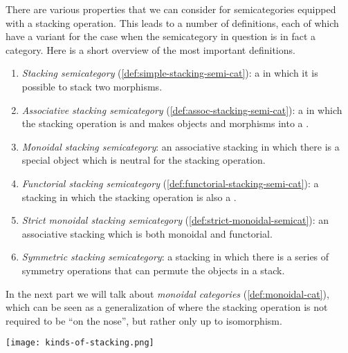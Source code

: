There are various properties that we can consider for semicategories equipped with a stacking operation.
This leads to a number of definitions, each of which have a variant for the case when the semicategory in question is in fact a category.
Here is a short overview of the most important definitions.
%
\begin{enumerate}
    \item \emph{Stacking semicategory} (\cref{def:simple-stacking-semi-cat}): a  in which it is possible to stack two morphisms.
    \item \emph{Associative stacking semicategory} (\cref{def:assoc-stacking-semi-cat}): a  in which the stacking operation is  and makes objects and morphisms into a .
    \item \emph{Monoidal stacking semicategory}: an associative stacking  in which there is a special object which is neutral for the stacking operation.
    \item \emph{Functorial stacking semicategory} (\cref{def:functorial-stacking-semi-cat}): a stacking  in which the stacking operation is also a .
    \item \emph{Strict monoidal stacking semicategory} (\cref{def:strict-monoidal-semicat}): an associative stacking  which is both monoidal and functorial.
    \item \emph{Symmetric stacking semicategory}: a stacking  in which there is a series of symmetry operations that can permute the objects in a stack.
\end{enumerate}
%
In the next part we will talk about \emph{monoidal categories} (\cref{def:monoidal-cat}), which can be seen as a generalization of   where the stacking operation is not required to be  ``on the nose'', but rather only up to isomorphism.


\begin{center}
    \texttt{[image: kinds-of-stacking.png]}
\end{center}

